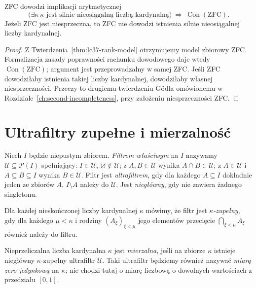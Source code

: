 \begin{wniosek}
\label{cor:lc37-inaccessible-con}
ZFC dowodzi implikacji arytmetycznej
\[
 \bigl(\exists\kappa\
    \text{$\kappa$ jest silnie nieosiągalną liczbą kardynalną}\bigr)
 \ \Longrightarrow\ \operatorname{Con}(\mathrm{ZFC}).
\]
Jeżeli ZFC jest niesprzeczna, to
ZFC nie dowodzi istnienia silnie nieosiągalnej
liczby kardynalnej.
\end{wniosek}
\begin{proof}
Z Twierdzenia~\ref{thm:lc37-rank-model} otrzymujemy
model zbiorowy ZFC. Formalizacja zasady poprawności
rachunku dowodowego daje wtedy
$\operatorname{Con}(\mathrm{ZFC})$;
argument jest przeprowadzalny w samej ZFC.
Jeśli ZFC dowodziłaby istnienia takiej liczby kardynalnej,
dowodziłaby własnej niesprzeczności.
Przeczy to drugiemu twierdzeniu Gödla
omówionemu w Rozdziale~\ref{ch:second-incompleteness},
przy założeniu niesprzeczności ZFC.
\end{proof}

\section{Ultrafiltry zupełne i mierzalność}

\begin{definicja}
\label{def:lc37-complete-ultrafilter}
Niech $I$ będzie niepustym zbiorem.
\emph{Filtrem właściwym} na $I$ nazywamy
$\mathcal U\subseteq\mathcal P(I)$ spełniający:
$I\in\mathcal U$, $\varnothing\notin\mathcal U$;
z $A,B\in\mathcal U$ wynika
$A\cap B\in\mathcal U$; z $A\in\mathcal U$
i $A\subseteq B\subseteq I$ wynika $B\in\mathcal U$.
Filtr jest \emph{ultrafiltrem}, gdy
dla każdego $A\subseteq I$ dokładnie jeden
ze zbiorów $A$, $I\setminus A$ należy do
$\mathcal U$. Jest \emph{niegłówny}, gdy
nie zawiera żadnego singletonu.

Dla każdej nieskończonej liczby kardynalnej $\kappa$ mówimy,
że filtr jest \emph{$\kappa$-zupełny}, gdy
dla każdego $\mu<\kappa$ i rodziny
$(A_\xi)_{\xi<\mu}$ jego elementów
przecięcie $\bigcap_{\xi<\mu}A_\xi$ również
należy do filtru.
\end{definicja}

\begin{definicja}
\label{def:lc37-measurable}
Nieprzeliczalna liczba kardynalna $\kappa$ jest
\emph{mierzalna}, jeśli na zbiorze $\kappa$
istnieje niegłówny $\kappa$-zupełny
ultrafiltr $\mathcal U$.
Taki ultrafiltr będziemy również nazywać
\emph{miarą zero-jedynkową} na $\kappa$;
nie chodzi tutaj o miarę liczbową o dowolnych
wartościach z przedziału $[0,1]$.
\end{definicja}

